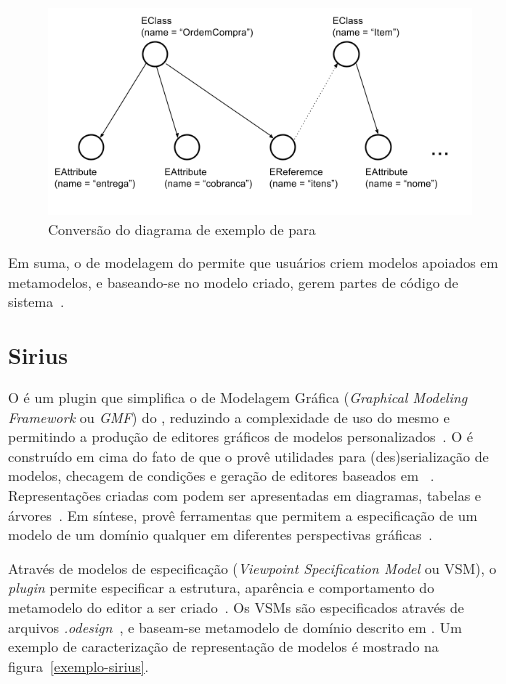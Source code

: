 \begin{figure}[h]
	\centering
	\includegraphics[width=1\textwidth]{figuras/exemplos-emf/uml-to-ecore.png}
	\caption{Conversão do diagrama de exemplo de \uml para \ecore}
	\label{exemplo-uml-to-ecore}
\end{figure}

Em suma, o \framework de modelagem do \eclipse permite que usuários criem modelos apoiados em metamodelos, e baseando-se no modelo criado, gerem partes de código de sistema~\cite{vujovic2014comparative}.


\subsection{Sirius}

O \sirius é um plugin que simplifica o \framework de Modelagem Gráfica (\textit{Graphical Modeling Framework} ou \textit{GMF}) do \eclipse, reduzindo a complexidade de uso do mesmo e permitindo a produção de editores gráficos de modelos personalizados~\cite{viyovic2014sirius}. O \sirius é construído em cima do fato de que o \eclipse provê utilidades para (des)serialização de modelos, checagem de condições e geração de editores baseados em \ecore~\cite{budinsky2004eclipse}. Representações criadas com \sirius podem ser apresentadas em diagramas, tabelas e árvores~\cite{viyovic2014sirius}. Em síntese, \sirius provê ferramentas que permitem a especificação de um modelo de um domínio qualquer em diferentes perspectivas gráficas~\cite{vujovic2014comparative}.

Através de modelos de especificação (\textit{Viewpoint Specification Model} ou VSM), o \textit{plugin} permite especificar a estrutura, aparência e comportamento do metamodelo do editor a ser criado~\cite{viyovic2014sirius}. Os VSMs são especificados através de arquivos \textit{.odesign}~\cite{viyovic2014sirius}, e baseam-se metamodelo de domínio descrito em \ecore. Um exemplo de caracterização de representação de modelos é mostrado na figura~\ref{exemplo-sirius}.

